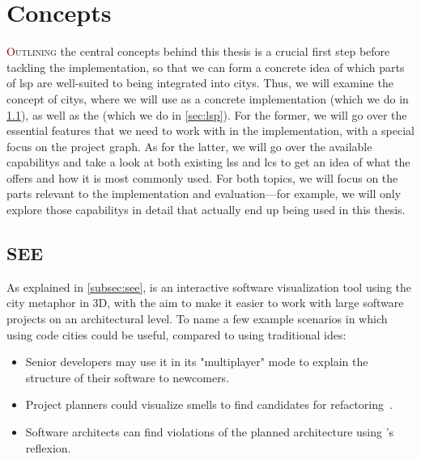 \documentclass[../thesis]{subfiles}
\begin{document}
\chapter{Concepts}\label{ch:concepts}

\lettrine[lines=3]{\textcolor{Maroon}{O}}{utlining} the central concepts behind this thesis is a crucial first step before tackling the implementation, so that we can form a concrete idea of which parts of \gls{lsp} are well-suited to being integrated into \glspl{city}.
Thus, we will examine the concept of \glspl{city}, where we will use \SEE{} as a concrete implementation (which we do in \cref{sec:see}), as well as the  (which we do in \cref{sec:lsp}).
For the former, we will go over the essential features that we need to work with in the implementation, with a special focus on the project graph.
As for the latter, we will go over the available \glspl{capability} and take a look at both existing \glspl{ls} and \glspl{lc} to get an idea of what the  offers and how it is most commonly used.
For both topics, we will focus on the parts relevant to the implementation and evaluation---for example, we will only explore those \glspl{capability} in detail that actually end up being used in this thesis.

\section{SEE}\label{sec:see}

As explained in \cref{subsec:see}, \SEE{} is an interactive software visualization tool using the \gls{city} metaphor in 3D, with the aim to make it easier to work with large software projects on an architectural level.
To name a few example scenarios in which using code cities could be useful, compared to using traditional \glspl{ide}:
\begin{itemize}
	\item Senior developers may use it in its "multiplayer" mode to explain the structure of their software to newcomers.
	\item Project planners could visualize \glspl{smell} to find candidates for refactoring~\cite{galperin2021}.
	\item Software architects can find violations of the planned architecture using \SEE{}'s \gls{reflexion}.
\end{itemize}
\end{document}
